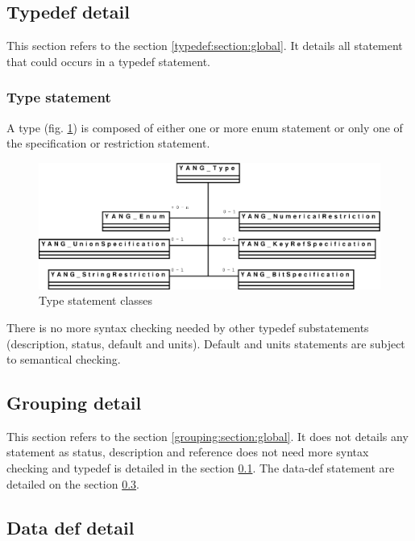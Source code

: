 \documentclass[a4paper]{article}
\begin{document}
\subsection{Typedef detail}
\label{typedef:section:detail}

This  section refers to  the section  \ref{typedef:section:global}. It
details all statement that could occurs in a typedef statement.

\subsubsection{Type statement}
\label{type:section:global}

 A  type (fig.  \ref{type}) is  composed of  either one  or  more enum
 statement or only one of the specification or restriction statement.
\begin{figure}[htbp]
\begin{center}
\includegraphics[scale = .3]{type.eps}
\end{center}
\caption{Type statement classes}
\label{type}
\end{figure}

There  is   no  more  syntax   checking  needed  by   other  typedef
substatements  (description, status, default  and units).  Default and
units statements are subject to semantical checking.

\subsection{Grouping detail}
\label{grouping:section:detail}

This section  refers to the  section \ref{grouping:section:global}. It
does not  details any statement  as status, description  and reference
does  not need more  syntax checking  and typedef  is detailed  in the
section  \ref{typedef:section:detail}.   The  data-def  statement  are
detailed on the section \ref{datadef:section:detail}.

\subsection{Data def detail}
\label{datadef:section:detail}
\end{document}
